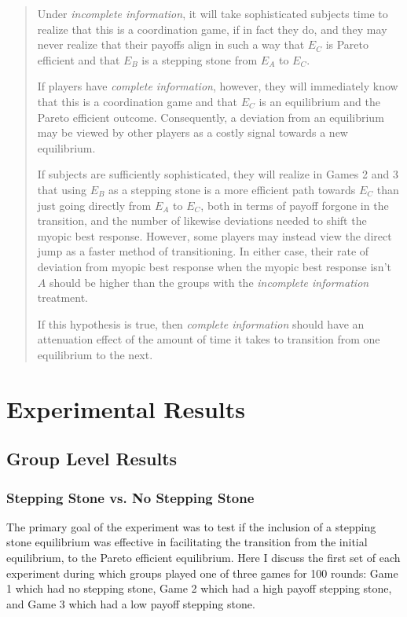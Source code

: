 \begin{quote}

Under \textit{incomplete information}, it will take sophisticated subjects time to realize that this is a coordination game, if in fact they do, and they may never realize that their payoffs align in such a way that $E_C$ is Pareto efficient and that $E_B$ is a stepping stone from $E_A$ to $E_C$.


If players have \textit{complete information}, however, they will immediately know that this is a coordination game and that $E_C$ is an equilibrium and the Pareto efficient outcome. Consequently, a deviation from an equilibrium may be viewed by other players as a costly signal towards a new equilibrium.

If subjects are sufficiently sophisticated, they will realize in Games 2 and 3 that using $E_B$ as a stepping stone is a more efficient path towards $E_C$ than just going directly from $E_A$ to $E_C$, both in terms of payoff forgone in the transition, and the number of likewise deviations needed to shift the myopic best response. However, some players may instead view the direct jump as a faster method of transitioning. In either case, their rate of deviation from myopic best response when the myopic best response isn't $A$ should be higher than the groups with the \textit{incomplete information} treatment.

If this hypothesis is true, then \textit{complete information} should have an attenuation effect of the amount of time it takes to transition from one equilibrium to the next.

\end{quote}

\section{Experimental Results}

\subsection{Group Level Results}


\subsubsection*{Stepping Stone vs. No Stepping Stone}
The primary goal of the experiment was to test if the inclusion of a stepping stone equilibrium was effective in facilitating the transition from the initial equilibrium, to the Pareto efficient equilibrium. Here I discuss the first set of each experiment during which groups played one of three games for 100 rounds: Game 1 which had no stepping stone, Game 2 which had a high payoff stepping stone, and Game 3 which had a low payoff stepping stone. 

